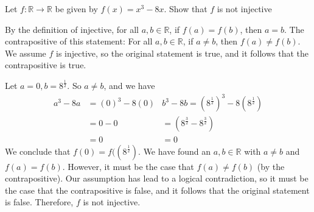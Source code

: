 \documentclass[12pt]{article}
\newenvironment{problem}[2][Problem]
{
	\begin{trivlist} 
		\item[\hskip \labelsep {\bfseries #1 #2:}]
	}
{
	\end{trivlist}
	}
\newenvironment{solution}[1][Solution]
{
	\begin{trivlist} 
		\item[\hskip \labelsep {\itshape #1:}]
	}
	{
	\end{trivlist}
}
\begin{document}
\begin{problem}{1}
Let $f:\mathbb{R} \to \mathbb{R}$ be given by $f(x)= x^3 -8x$. Show that $f$ is not injective
\begin{solution}
By the definition of injective, for all $a,b \in \mathbb{R}$, if $f(a)=f(b)$, then $a=b$. The contrapositive of this statement: For all $a,b \in \mathbb{R}$, if $a \neq b$, then $f(a) \neq f(b)$. We assume $f$ is injective, so the original statement is true, and it follows that the contrapositive is true. 

\noindent
Let $a=0, b=8^\frac{1}{2}$. So $a \neq b$, and we have
\begin{align*}
a^3-8a &= (0)^3 - 8(0) & b^3-8b= (8^\frac{1}{2})^3 -8(8^\frac{1}{2})\\
&=0 - 0 & =(8^\frac{3}{2}-8^\frac{3}{2})\\
&=0 &=0
\end{align*}
We conclude that $f(0)=f((8^\frac{1}{2})$. We have found an $a,b \in \mathbb{R}$ with $a \neq b$ and $f(a) = f(b)$. However, it must be the case that $f(a) \neq f(b)$ (by the contrapositive). Our assumption has lead to a logical contradiction, so it must be the case that the contrapositive is false, and it follows that the original statement is false. Therefore, $f$ is not injective.
\end{solution}
\end{problem}
\end{document}
